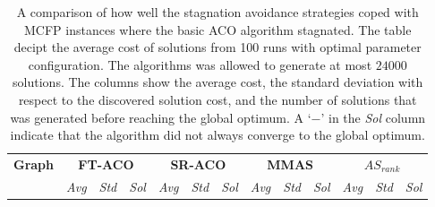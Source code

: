 \begin{sidewaystable}[p]
   \tiny
   \caption[Stagnation avoidance efficiency]{A comparison of how well the stagnation avoidance strategies coped with MCFP instances where the basic ACO algorithm stagnated. The table decipt the average cost of solutions from 100 runs with optimal parameter configuration. The algorithms was allowed to generate at most $24000$ solutions. The columns show the average cost, the standard deviation with respect to the discovered solution cost, and the number of solutions that was generated before reaching the global optimum. A `$-$' in the \emph{Sol} column indicate that the algorithm did not always converge to the global optimum.}
   \centering
   
   \begin{tabular}{lrrrrrrrrrrrr}
   \toprule
   
  \textbf{Graph} & \multicolumn{3}{c}{\textbf{FT\@{-}ACO}} & \multicolumn{3}{c}{\textbf{SR\@{-}ACO}} & \multicolumn{3}{c}{\textbf{MMAS}} & \multicolumn{3}{c}{\textbf{$AS_{rank}$}}\\
  \cmidrule(lr){2-4}
  \cmidrule(lr){5-7}
  \cmidrule(lr){8-10}
  \cmidrule(lr){11-13}
  & \emph{Avg} & \emph{Std} & \emph{Sol} & \emph{Avg} & \emph{Std} & \emph{Sol} & \emph{Avg} & \emph{Std} & \emph{Sol} & \emph{Avg} & \emph{Std} & \emph{Sol}\\
  \cmidrule(lr){2-2}
  \cmidrule(lr){3-3}
  \cmidrule(lr){4-4}
  \cmidrule(lr){5-5}
  \cmidrule(lr){6-6}
  \cmidrule(lr){7-7}
  \cmidrule(lr){8-8}
  \cmidrule(lr){9-9}
  \cmidrule(lr){10-10}
  \cmidrule(lr){11-11}
  \cmidrule(lr){12-12}
  \cmidrule(lr){13-13}
  

\end{tabular}
\end{sidewaystable}
